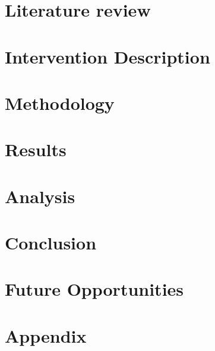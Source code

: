 \documentclass[11pt,usenames,dvipsnames]{article} %
\begin{document}
\section{Literature review}  \label{sec:lit_review}


\section{Intervention Description} \label{sec:proj_desc}
%

\section{Methodology} \label{sec:methodology}
%

\section{Results}
\section{Analysis}
%
\section{Conclusion}

\section{Future Opportunities}









\newpage
{\footnotesize
	
	 \label{sec:bibliography}
}

\newpage
\section*{Appendix}  \label{sec:appendices}
\begin{appendices}
	
\end{appendices}
\end{document}
